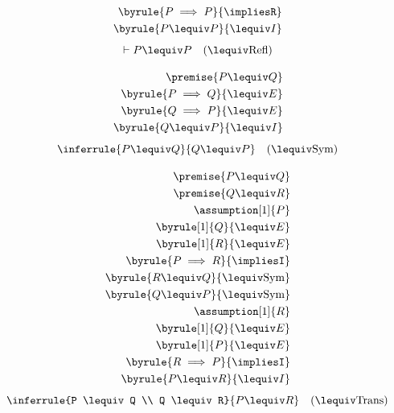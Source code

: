\begin{align*}
    \byrule{P \implies P}{\impliesR}\\
    \byrule{P \lequiv P}{\lequivI}
\end{align*}
\newcommand{\lequivR}{{\lequiv}\text{Refl}}
\[\vdash P \lequiv P \quad (\lequivR)\]

\begin{align*}
    \premise{P \lequiv Q}\\
    \byrule{P \implies Q}{\lequivE}\\
    \byrule{Q \implies P}{\lequivE}\\
    \byrule{Q \lequiv P}{\lequivI}
\end{align*}
\newcommand{\lequivC}{{\lequiv}\text{Sym}}
\newcommand{\lequivS}{{\lequiv}\text{Sym}} %
\[\inferrule{P \lequiv Q}{Q \lequiv P} \quad (\lequivC)\]

\begin{align*}
    \premise{P \lequiv Q}\\
    \premise{Q \lequiv R}\\
    \assumption[1]{P}\\
    \byrule[1]{Q}{\lequivE}\\
    \byrule[1]{R}{\lequivE}\\
    \byrule{P \implies R}{\impliesI}\\
    \byrule{R \lequiv Q}{\lequivC}\\
    \byrule{Q \lequiv P}{\lequivC}\\
    \assumption[1]{R}\\
    \byrule[1]{Q}{\lequivE}\\
    \byrule[1]{P}{\lequivE}\\
    \byrule{R \implies P}{\impliesI}\\
    \byrule{P \lequiv R}{\lequivI}
\end{align*}
\newcommand{\lequivT}{{\lequiv}\text{Trans}}
\newcommand{\lequivA}{{\lequiv}\text{Trans}} %
\[\inferrule{P \lequiv Q \\ Q \lequiv R}{P \lequiv R} \quad (\lequivA)\]

